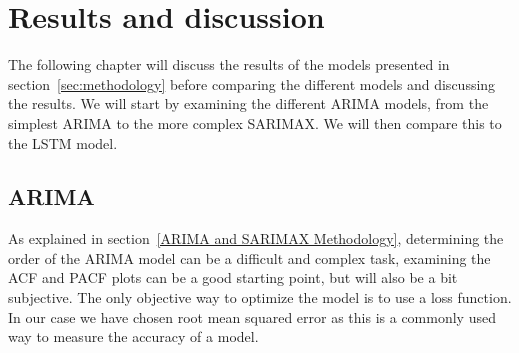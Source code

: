 \section{Results and discussion}\label{sec:results}
The following chapter will discuss the results of the models presented in section~\ref{sec:methodology} before comparing the different models and discussing the results. We will start by examining the different ARIMA models, from the simplest ARIMA to the more complex SARIMAX. We will then compare this to the LSTM model. 

\subsection{ARIMA}\label{sec:arima}
As explained in section~\ref{ARIMA and SARIMAX Methodology}, determining the order of the ARIMA model can be a difficult and complex task, examining the ACF and PACF plots can be a good starting point, but will also be a bit subjective. The only objective way to optimize the model is to use a loss function. In our case we have chosen root mean squared error as this is a commonly used way to measure the accuracy of a model.

